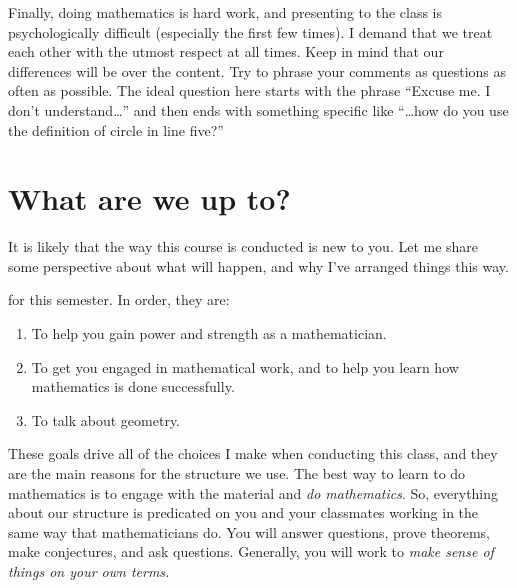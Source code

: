 \documentclass{tufte-handout}
\theoremstyle{definition}
\begin{document}
Finally, doing mathematics is hard work, and presenting to the class is psychologically difficult (especially the first few times).
I demand that we treat each other with the utmost respect at all times.
Keep in mind that our differences will be over the content.
Try to phrase your comments as questions as often as possible.
The ideal question here starts with the phrase ``Excuse me. I don't understand\dots'' and then ends with something specific like ``\dots how do you use the definition of circle in line five?''


\section*{What are we up to?}

It is likely that the way this course is conducted is new to you.
Let me share some perspective about what will happen, and why I've arranged things this way.

 for this semester. In order, they are:
\begin{enumerate}
\item To help you gain power and strength as a mathematician.

\item To get you engaged in mathematical work, and to help you learn how mathematics is done successfully.

\item To talk about geometry.
\end{enumerate}

These goals drive all of the choices I make when conducting this class, and they are the main reasons for the structure we use.
The best way to learn to do mathematics is to engage with the material and \emph{do mathematics}.
So, everything about our structure is predicated on you and your classmates working in the same way that mathematicians do.
You will answer questions, prove theorems, make conjectures, and ask questions.
Generally, you will work to \emph{make sense of things on your own terms.}
\end{document}
